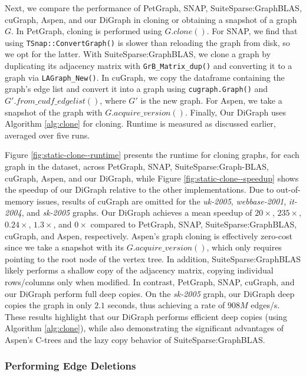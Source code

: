 Next, we compare the performance of PetGraph, SNAP, SuiteSparse:GraphBLAS, cuGraph, Aspen, and our DiGraph in cloning or obtaining a snapshot of a graph $G$. In PetGraph, cloning is performed using $G.clone()$. For SNAP, we find that using \texttt{TSnap::ConvertGraph()} is slower than reloading the graph from disk, so we opt for the latter. With SuiteSparse:GraphBLAS, we clone a graph by duplicating its adjacency matrix with \texttt{GrB\_Matrix\_dup()} and converting it to a graph via \texttt{LAGraph\_New()}. In cuGraph, we copy the dataframe containing the graph's edge list and convert it into a graph using \texttt{cugraph.Graph()} and $G'.from\_cudf\_edgelist()$, where $G'$ is the new graph. For Aspen, we take a snapshot of the graph with $G.acquire\_version()$. Finally, Our DiGraph uses Algorithm \ref{alg:clone} for cloning. Runtime is measured as discussed earlier, averaged over five runs.



Figure \ref{fig:static-clone--runtime} presents the runtime for cloning graphs, for each graph in the dataset, across PetGraph, SNAP, SuiteSparse:Graph-BLAS, cuGraph, Aspen, and our DiGraph, while Figure \ref{fig:static-clone--speedup} shows the speedup of our DiGraph relative to the other implementations. Due to out-of-memory issues, results of cuGraph are omitted for the \textit{uk-2005}, \textit{webbase-2001}, \textit{it-2004}, and \textit{sk-2005} graphs. Our DiGraph achieves a mean speedup of $20\times$, $235\times$, $0.24\times$, $1.3\times$, and $0\times$ compared to PetGraph, SNAP, SuiteSparse:GraphBLAS, cuGraph, and Aspen, respectively. Aspen’s graph cloning is effectively zero-cost since we take a snapshot with its $G.acquire\_version()$, which only requires pointing to the root node of the vertex tree. In addition, SuiteSparse:GraphBLAS likely performs a shallow copy of the adjacency matrix, copying individual rows/columns only when modified. In contrast, PetGraph, SNAP, cuGraph, and our DiGraph perform full deep copies. On the \textit{sk-2005} graph, our DiGraph deep copies the graph in only $2.1$ seconds, thus achieving a rate of $908M$ edges/s. These results highlight that our DiGraph performs efficient deep copies (using Algorithm \ref{alg:clone}), while also demonstrating the significant advantages of Aspen’s C-trees and the lazy copy behavior of SuiteSparse:GraphBLAS.




\subsubsection{Performing Edge Deletions}
\label{sec:perform-edge-deletions}

